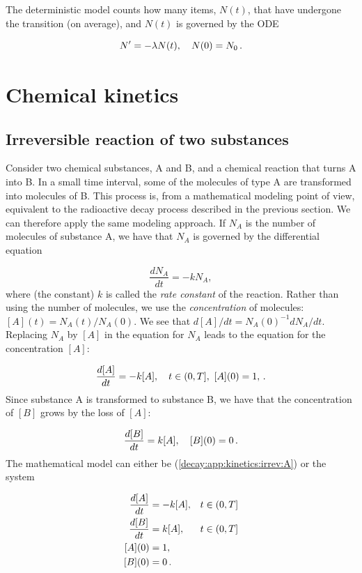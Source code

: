 \documentclass[%
oneside,                 %
final,                   %
10pt]{article}
\begin{document}
The deterministic model counts how many items, $N(t)$, that have
undergone the transition (on average), and $N(t)$ is governed by the ODE

\[ N^{\prime} = -\lambda N(t),\quad N(0)=N_0\tp\]


\section{Chemical kinetics}
\label{decay:app:kinetics}


\subsection{Irreversible reaction of two substances}

Consider two chemical substances, A and B, and a chemical reaction that
turns A into B. In a small time interval, some of the
molecules of type A are transformed into molecules of B. This process is,
from a mathematical modeling point of view, equivalent to the
radioactive decay process described in the previous section. We can
therefore apply the same modeling approach. If $N_A$ is the number of
molecules of substance A, we have that $N_A$ is governed by the
differential equation

\[ \frac{dN_A}{dt} = -kN_A,\]
where (the constant) $k$ is called the \emph{rate constant} of the reaction.
Rather than using the number of molecules, we use the \emph{concentration}
of molecules: $[A](t) = N_A(t)/N_A(0)$.
We see that $d[A]/dt = N_A(0)^{-1} dN_A/dt$.
Replacing $N_A$ by $[A]$ in the equation for $N_A$ leads to the equation
for the concentration $[A]$:

\begin{equation}
\frac{d[A]}{dt} = -k[A],\quad t\in (0,T],\ [A](0)=1, \tp
\label{decay:app:kinetics:irrev:A}
\end{equation}
Since substance A is transformed to substance B, we have that the concentration
of $[B]$ grows by the loss of $[A]$:

\[
\frac{d[B]}{dt} = k[A],\quad [B](0)=0\tp
\]
The mathematical model can either be (\ref{decay:app:kinetics:irrev:A}) or
the system

\begin{align}
\frac{d[A]}{dt} &= -k[A], &t\in (0,T]\\ 
\frac{d[B]}{dt} &= k[A], &t\in (0,T]\\ 
[A](0) &= 1,\\ 
[B](0) &= 0\tp
\end{align}
\end{document}
